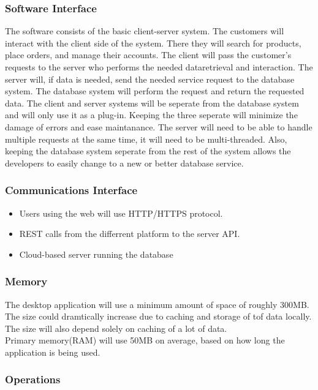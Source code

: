 \documentclass[a4paper,10pt]{article}
\begin{document}
            \subsubsection{Software Interface}
           {
	   The software consists of the basic client-server system. The customers will interact with the client side of the system. There they will search for products, place orders, and manage their accounts. The client will pass the customer's requests to the server who performs the needed dataretrieval and interaction. The server will, if data is needed, send the needed service request to the database system. The database system will perform the request and return the requested data. The client and server systems will be seperate from the database system and will only use it as a plug-in. Keeping the three seperate will minimize the damage of errors and ease maintanance. The server will need to be able to handle multiple requests at the same time, it will need to be multi-threaded.  Also, keeping the database system seperate from the rest of the system allows the developers to easily change to a new or better database service.}

	    \subsubsection{Communications Interface}
	 \begin{itemize}
	    \item Users using the web will use HTTP/HTTPS protocol.
	    \item REST calls from the differrent platform to the server API.
	    \item Cloud-based server running the database
	    \end{itemize}
            \subsubsection{Memory}
	    {The desktop application will use a minimum amount of space of roughly 300MB.  The size could dramtically increase due to caching and storage of tof data locally. The size will also depend solely on caching of a lot of data. \\
Primary memory(RAM) will use 50MB on average, based on how long the application is being used.}
            \subsubsection{Operations}
\end{document}
